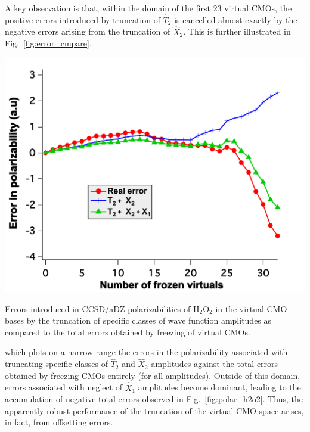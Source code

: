 A key observation is that, within the domain of the first 23 virtual CMOs, the
positive errors introduced by truncation of $\hat{T}_2$ is cancelled almost
exactly by the negative errors arising from the truncation of $\hat{X}_2$.
This is further illustrated in Fig.~\ref{fig:error_cmpare}, 
\begin{MyFigure}[h!]
\centering
\includegraphics[width=0.6\linewidth,natwidth=610,natheight=642]{figures_fvno/error_cmpare.pdf}
\caption{{\footnotesize Errors introduced in CCSD/aDZ polarizabilities of
H$_2$O$_2$ in the virtual CMO bases by the truncation of specific classes of wave
function amplitudes as compared to the total errors obtained by freezing of
virtual CMOs.}}
\label{fig:error_compare}
\end{MyFigure}
which plots on a narrow range the errors in the polarizability associated with truncating
specific classes of $\hat{T}_2$ and $\hat{X}_2$ amplitudes against the total errors
obtained by freezing CMOs entirely (for all amplitudes).  Outside of this
domain, errors associated with neglect of $\hat{X}_1$ amplitudes become
dominant, leading to the accumulation of negative total errors observed in
Fig.~\ref{fig:polar_h2o2}.  Thus, the apparently robust performance of the
truncation of the virtual CMO space arises, in fact, from offsetting
errors.

